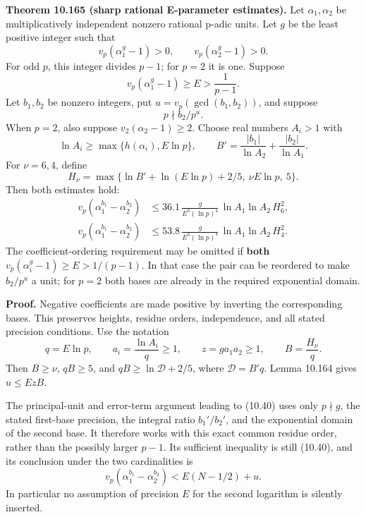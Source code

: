 \documentclass[
  11pt,
  a4paper,
]{article}
\begin{document}
\textbf{Theorem 10.165 (sharp rational E-parameter estimates).} Let
\(\alpha_1,\alpha_2\) be multiplicatively independent nonzero rational
p-adic units. Let \(g\) be the least positive integer such that \[
v_p(\alpha_1^g-1)>0,\qquad v_p(\alpha_2^g-1)>0.
\tag{10.550}
\] For odd \(p\), this integer divides \(p-1\); for \(p=2\) it is one.
Suppose \[
v_p(\alpha_1^g-1)\ge E>\frac1{p-1}.
\tag{10.551}
\] Let \(b_1,b_2\) be nonzero integers, put \(u=v_p(\gcd(b_1,b_2))\),
and suppose \[
p\nmid b_2/p^u.
\tag{10.552}
\] When \(p=2\), also suppose \(v_2(\alpha_2-1)\ge2\). Choose real
numbers \(A_i>1\) with \[
\ln A_i\ge\max\{h(\alpha_i),E\ln p\},\qquad
B'=\frac{|b_1|}{\ln A_2}+\frac{|b_2|}{\ln A_1}.
\tag{10.553}
\] For \(\nu=6,4\), define \[
H_\nu=\max\{\ln B'+\ln(E\ln p)+2/5,\ \nu E\ln p,\ 5\}.
\tag{10.554}
\] Then both estimates hold: \[
\begin{aligned}
v_p(\alpha_1^{b_1}-\alpha_2^{b_2})
&\le36.1\,\frac{g}{E^3(\ln p)^4}\,
\ln A_1\ln A_2\,H_6^2,\\
v_p(\alpha_1^{b_1}-\alpha_2^{b_2})
&\le53.8\,\frac{g}{E^3(\ln p)^4}\,
\ln A_1\ln A_2\,H_4^2.
\end{aligned}
\tag{10.555}
\] The coefficient-ordering requirement may be omitted if \textbf{both}
\(v_p(\alpha_i^g-1)\ge E>1/(p-1)\). In that case the pair can be
reordered to make \(b_2/p^u\) a unit; for \(p=2\) both bases are already
in the required exponential domain.

\textbf{Proof.} Negative coefficients are made positive by inverting the
corresponding bases. This preserves heights, residue orders,
independence, and all stated precision conditions. Use the notation \[
q=E\ln p,\qquad a_i=\frac{\ln A_i}{q}\ge1,\qquad
z=ga_1a_2\ge1,\qquad B=\frac{H_\nu}{q}.
\tag{10.556}
\] Then \(B\ge\nu\), \(qB\ge5\), and \(qB\ge\ln\mathcal D+2/5\), where
\(\mathcal D=B'q\). Lemma 10.164 gives \(u\le EzB\).

The principal-unit and error-term argument leading to (10.40) uses only
\(p\nmid g\), the stated first-base precision, the integral ratio
\(b_1'/b_2'\), and the exponential domain of the second base. It
therefore works with this exact common residue order, rather than the
possibly larger \(p-1\). Its sufficient inequality is still (10.40), and
its conclusion under the two cardinalities is \[
v_p(\alpha_1^{b_1}-\alpha_2^{b_2})<E(N-1/2)+u.
\tag{10.557}
\] In particular no assumption of precision \(E\) for the second
logarithm is silently inserted.
\end{document}
